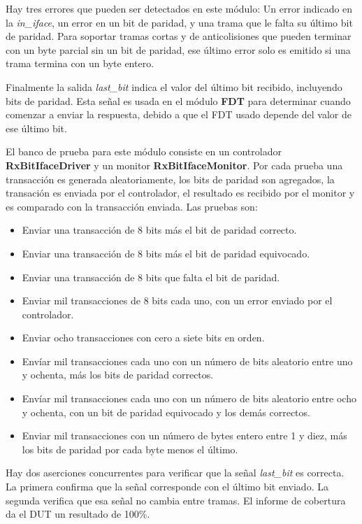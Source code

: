 \documentclass[a4paper, twoside, 11pt]{report}
\begin{document}
Hay tres errores que pueden ser detectados en este módulo: Un error indicado en la \textit{in\_iface}, un error en un bit de paridad, y una trama que le falta su último bit de paridad. Para soportar tramas cortas y de anticolisiones que pueden terminar con un byte parcial sin un bit de paridad, ese último error solo es emitido si una trama termina con un byte entero.

Finalmente la salida \textit{last\_bit} indica el valor del último bit recibido, incluyendo bits de paridad. Esta señal es usada en el módulo \textbf{FDT} para determinar cuando comenzar a enviar la respuesta, debido a que el FDT usado depende del valor de ese último bit.

El banco de prueba para este módulo consiste en un controlador \textbf{RxBitIfaceDriver} y un monitor \textbf{RxBitIfaceMonitor}. Por cada prueba una transacción es generada aleatoriamente, los bits de paridad son agregados, la transación es enviada por el controlador, el resultado es recibido por el monitor y es comparado con la transacción enviada. Las pruebas son:

\begin{itemize}
  \item Enviar una transacción de 8 bits más el bit de paridad correcto.
  \item Enviar una transacción de 8 bits más el bit de paridad equivocado.
  \item Enviar una transacción de 8 bits que falta el bit de paridad.
  \item Enviar mil transacciones de 8 bits cada uno, con un error enviado por el controlador.
  \item Enviar ocho transacciones con cero a siete bits en orden.
  \item Envíar mil transacciones cada uno con un número de bits aleatorio entre uno y ochenta, más los bits de paridad correctos.
  \item Envíar mil transacciones cada uno con un número de bits aleatorio entre ocho y ochenta, con un bit de paridad equivocado y los demás correctos.
  \item Enviar mil transacciones con un número de bytes entero entre 1 y diez, más los bits de paridad por cada byte menos el último.
\end{itemize}

Hay dos aserciones concurrentes para verificar que la señal \textit{last\_bit} es correcta. La primera confirma que la señal corresponde con el último bit enviado. La segunda verifica que esa señal no cambia entre tramas. El informe de cobertura da el DUT un resultado de 100\%.
\end{document}
